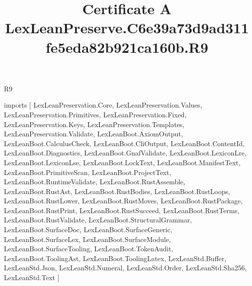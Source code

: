 \begin{lexlean}{R9}
\title{Certificate A LexLeanPreserve.C6e39a73d9ad311fe5eda82b921ca160b.R9}
\begin{coremodule}
imports [
  LexLeanPreservation.Core,
  LexLeanPreservation.Values,
  LexLeanPreservation.Primitives,
  LexLeanPreservation.Fixed,
  LexLeanPreservation.Keys,
  LexLeanPreservation.Templates,
  LexLeanPreservation.Validate,
  LexLeanBoot.AxiomOutput,
  LexLeanBoot.CalculusCheck,
  LexLeanBoot.CliOutput,
  LexLeanBoot.ContentId,
  LexLeanBoot.Diagnostics,
  LexLeanBoot.GnafValidate,
  LexLeanBoot.LexiconLre,
  LexLeanBoot.LexiconLse,
  LexLeanBoot.LockText,
  LexLeanBoot.ManifestText,
  LexLeanBoot.PrimitiveScan,
  LexLeanBoot.ProjectText,
  LexLeanBoot.RuntimeValidate,
  LexLeanBoot.RustAssemble,
  LexLeanBoot.RustAst,
  LexLeanBoot.RustBodies,
  LexLeanBoot.RustLoops,
  LexLeanBoot.RustLower,
  LexLeanBoot.RustMoves,
  LexLeanBoot.RustPackage,
  LexLeanBoot.RustPrint,
  LexLeanBoot.RustSucceed,
  LexLeanBoot.RustTerms,
  LexLeanBoot.RustValidate,
  LexLeanBoot.StructuralGrammar,
  LexLeanBoot.SurfaceDoc,
  LexLeanBoot.SurfaceGeneric,
  LexLeanBoot.SurfaceLex,
  LexLeanBoot.SurfaceModule,
  LexLeanBoot.SurfaceTooling,
  LexLeanBoot.TokenAudit,
  LexLeanBoot.ToolingAst,
  LexLeanBoot.ToolingLatex,
  LexLeanStd.Buffer,
  LexLeanStd.Json,
  LexLeanStd.Numeral,
  LexLeanStd.Order,
  LexLeanStd.Sha256,
  LexLeanStd.Text
]


\end{coremodule}
\end{lexlean}
